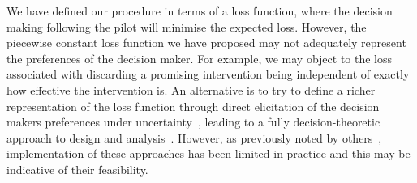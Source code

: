\documentclass[AMA,STIX1COL]{WileyNJD-v2}
\begin{document}

We have defined our procedure in terms of a loss function, where the decision making following the pilot will minimise the expected loss. However, the piecewise constant loss function we have proposed may not adequately represent the preferences of the decision maker. For example, we may object to the loss associated with discarding a promising intervention being independent of exactly how effective the intervention is. An alternative is to try to define a richer representation of the loss function through direct elicitation of the decision makers preferences under uncertainty~\cite{French2000}, leading to a fully decision-theoretic approach to design and analysis~\cite{Lindley1997}. However, as previously noted by others~\cite{Joseph1997a, Bacchetti2008, Whitehead2008}, implementation of these approaches has been limited in practice and this may be indicative of their feasibility.

\end{document}
